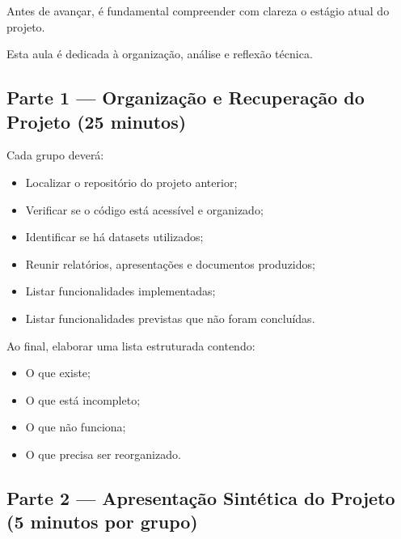 Antes de avançar, é fundamental compreender com clareza o estágio atual do projeto.

Esta aula é dedicada à organização, análise e reflexão técnica.


\subsection{Parte 1 — Organização e Recuperação do Projeto (25 minutos)}

\begin{boxAtividade}

Cada grupo deverá:

\begin{itemize}
\item Localizar o repositório do projeto anterior;
\item Verificar se o código está acessível e organizado;
\item Identificar se há datasets utilizados;
\item Reunir relatórios, apresentações e documentos produzidos;
\item Listar funcionalidades implementadas;
\item Listar funcionalidades previstas que não foram concluídas.
\end{itemize}

Ao final, elaborar uma lista estruturada contendo:

\begin{itemize}
\item O que existe;
\item O que está incompleto;
\item O que não funciona;
\item O que precisa ser reorganizado.
\end{itemize}

\end{boxAtividade}


\subsection{Parte 2 — Apresentação Sintética do Projeto (5 minutos por grupo)}

